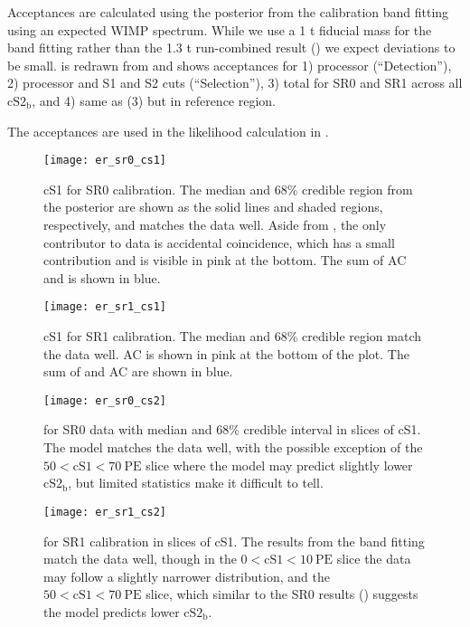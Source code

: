 Acceptances are calculated using the posterior from the calibration band fitting using an expected
WIMP spectrum.  While we use a 1 t fiducial mass for the band fitting rather than the 1.3 t run-combined
result () we expect deviations to be
small.   is redrawn from  and
shows acceptances for 1) processor (``Detection''), 2) processor and S1
and S2 cuts (``Selection''), 3) total for SR0 and SR1 across all $\mathrm{cS2_b}$, and 4) same as (3) but in reference region.

The acceptances are used in the likelihood calculation in .

\begin{figure}
\centering
\texttt{[image: er\_sr0\_cs1]}
\caption{cS1 for SR0  calibration.  The median and 68\% credible region from the posterior are shown as the solid lines and
shaded regions, respectively, and matches the data well.  Aside from , the only contributor to
data is accidental coincidence, which has a small contribution and is visible in pink at the bottom.  The sum of AC and  is
shown in blue.}
\label{fig:er_nr_calibrations_results_er_sr0_cs1}
\end{figure}

\begin{figure}
\centering
\texttt{[image: er\_sr1\_cs1]}
\caption{cS1 for SR1  calibration.  The median and 68\% credible region match the data well.  AC is shown in pink at the
bottom of the plot.  The sum of  and AC are shown in blue.}
\label{fig:er_nr_calibrations_results_er_sr1_cs1}
\end{figure}

\begin{figure}
\centering
\texttt{[image: er\_sr0\_cs2]}
\caption{\cstwob for SR0  data with median and 68\% credible interval in slices of cS1.  The model matches the data well,
with the possible exception of the $50 < \mathrm{cS1} < 70\ \mathrm{PE}$ slice where the model may predict slightly lower
$\mathrm{cS2_b}$, but limited statistics make it difficult to tell.}
\label{fig:er_nr_calibrations_results_er_sr0_cs2}
\end{figure}

\begin{figure}
\centering
\texttt{[image: er\_sr1\_cs2]}
\caption{\cstwob for SR1  calibration in slices of cS1.  The results from the band fitting match the data well, though in
the $0 < \mathrm{cS1} < 10\ \mathrm{PE}$ slice the data may follow a slightly narrower distribution, and the
$50 < \mathrm{cS1} < 70\ \mathrm{PE}$ slice, which similar to the SR0 results ()
suggests the model predicts lower $\mathrm{cS2_b}$.}
\label{fig:er_nr_calibrations_results_er_sr1_cs2}
\end{figure}

